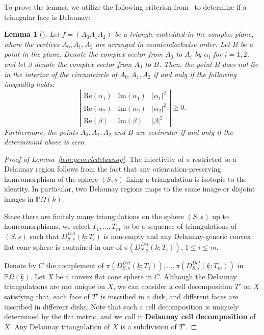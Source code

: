 \documentclass{compositio}
\numberwithin{equation}{section}
\numberwithin{figure}{section}
\theoremstyle{definition}
\theoremstyle{plain}
\newtheorem{lemma}[definition]{Lemma}
\begin{document}
{To prove the lemma, we utilize the following criterion from~\cite{GS} to determine if a triangular face is Delaunay:

\begin{lemma}[{\cite[Lemma~8.1]{GS}}]\label{lem:delaunaycondition}
    Let $f = (A_0A_1A_2)$ be a triangle embedded in the complex plane, where the vertices $A_0, A_1, A_2$ are arranged in counterclockwise order. Let $B$ be a point in the plane. Denote the complex vector from $A_0$ to $A_i$ by $\alpha_i$ for $i = 1, 2$, and let $\beta$ denote the complex vector from $A_0$ to $B$. Then, the point $B$ does not lie in the interior of the circumcircle of $A_0, A_1, A_2$ if and only if the following inequality holds:
    \begin{equation}\label{equ:delaunaycondition}
        \left|
        \begin{array}{ccc}
        \mathrm{Re}(\alpha_1)  & \mathrm{Im}(\alpha_1) & |\alpha_1|^2 \\
        \mathrm{Re}(\alpha_2)  & \mathrm{Im}(\alpha_2) & |\alpha_2|^2 \\
        \mathrm{Re}(\beta)  & \mathrm{Im}(\beta) & |\beta|^2
        \end{array}
        \right| \ge 0.
    \end{equation}
    Furthermore, the points $A_0,A_1,A_2$ and $B$ are cocircular if and only if the determinant above is zero.
\end{lemma}

\begin{proof}[Proof of Lemma~\ref{lem:genericdelaunay}]
The injectivity of $\pi$ restricted to a Delaunay region follows from the fact that any orientation-preserving homeomorphism of the sphere $(S, \underline{s})$ fixing a triangulation is isotopic to the identity. In particular, two Delaunay regions maps to the same image or disjoint images in  $\mathbb{P}\Omega(\underline{k})$.

Since there are finitely many triangulations on the sphere $(S, \underline{s})$ up to homeomorphisms, we select $T_1,\ldots,T_m$ to be a sequence of triangulations of $(S, \underline{s})$ such that $D_{S,\underline{s}}^{Del}(\underline{k};T_i)$ is non-empty and any Delaunay-generic convex flat cone sphere is contained in one of $\pi(D_{S,\underline{s}}^{Del}(\underline{k};T_i))$, $1\le i\le m$.

Denote by $C$ the complement of $\pi(D_{S,\underline{s}}^{Del}(\underline{k};T_1)), \ldots, \pi(D_{S,\underline{s}}^{Del}(\underline{k};T_m))$ in $\mathbb{P}\Omega(\underline{k})$. Let $X$ be a convex flat cone sphere in $C$. Although the Delaunay triangulations are not unique on $X$, we can consider a cell decomposition  $T'$ on $X$ satisfying that, each face of $T'$ is inscribed in a disk, and different faces are inscribed in different disks. Note that such a cell decomposition is uniquely determined by the flat metric,  and we call it \textbf{Delaunay cell decomposition} of $X$. Any Delaunay triangulation of $X$ is a subdivision of $T'$.


\end{proof}}
\end{document}
